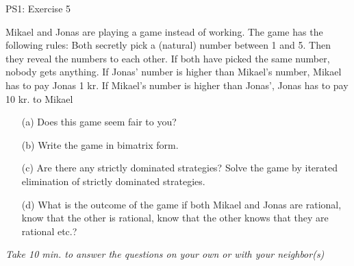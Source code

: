 \begin{frame}{PS1: Exercise 5}
\begin{multicols}{2}
  Mikael and Jonas are playing a game instead of working. The game has the following rules: Both secretly pick a (natural) number between 1 and 5. Then they reveal the numbers to each other. If both have picked the same number, nobody gets anything. If Jonas’ number is higher than Mikael’s number, Mikael has to pay Jonas 1 kr. If Mikael’s number is higher than Jonas’, Jonas has to pay 10 kr. to Mikael
\vfill\null \columnbreak
\begin{itemize}
  \item[(a)] Does this game seem fair to you?
  \item[(b)] Write the game in bimatrix form.
  \item[(c)] Are there any strictly dominated strategies? Solve the game by iterated elimination of strictly dominated strategies.
  \item[(d)] What is the outcome of the game if both Mikael and Jonas are rational, know that the other is rational, know that the other knows that they are rational etc.?
\end{itemize}
\vfill\null
\end{multicols}
\textit{Take 10 min. to answer the questions on your own or with your neighbor(s)}
\end{frame}

